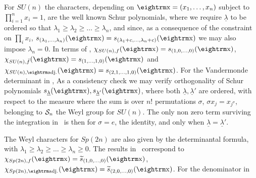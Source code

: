 For $SU(n)$ the characters, depending on $\x=(x_1,\dots , x_n)$ subject to 
$\prod_{i=1}^n x_i=1$, are the well known Schur polynomials,
\eqn{}
where we require ${\underline \lambda}$ to be ordered so that 
$\lambda_1 \ge \lambda_2 \ge \dots \ge \lambda_n$, and
since, as a consequence of the constraint on $\prod_i x_i$,
${s}_{(\lambda_1,\dots, \lambda_n)}(\x) = {s}_{(\lambda_1+c,\dots, \lambda_n+c)}(\x)$
we may also impose $\lambda_n=0$.
In terms of \expforch, $\chi_{SU(n),f}(\x)=s_{(1,0,\dots,0)}(\x)$, 
$\chi_{SU(n), {\bar f}}(\x)=s_{(1,\dots,1,0)}(\x)$ and
$\chi_{SU(n),\rm adj.}(\x)=s_{(2,1,\dots,1,0)}(\x)$. For the Vandermonde determinant
in \van,
\eqn{}
As a consistency check we may verify orthogonality of Schur polynomials
$s_{{\underline \lambda}}(\x), s_{{\underline \lambda'}}(\x)$, where both 
${\underline \lambda}, {\underline \lambda'}$ are ordered,
with respect to the measure \invG
\eqn{}
where the sum is over $n!$ permutations $\sigma$, $\sigma x_j = x_{j^\sigma}$,
belonging to $\S_n$ the Weyl
group for $SU(n)$. The only non zero term surviving the integration in \orth\
is then for $\sigma = e$, the identity, and only when 
${\underline \lambda} = {\underline \lambda'}$.

The Weyl characters for $Sp(2n)$ are also given by the determinantal formula,
\eqn{}
with $\lambda_1 \ge \lambda_2 \ge \dots \ge \lambda_n\ge0$. The results in \weylsp\
correspond to ${\chi}_{Sp(2n),f}(\x)={\widetilde s}_{(1,0,\dots, 0)}(\x)$,
${\chi}_{Sp(2n),{\rm adj.}}(\x)={\widetilde s}_{(2,0,\dots, 0)}(\x)$. For the
denominator in \cspn
\eqn\den{
\det\left[x_i{}^{n-j+1}-x_i{}^{-n+j-1}\right]=
\De(\x+\x^{-1})\prod_{i=1}^n(x_i-x_i{}^{-1})\, .
}

